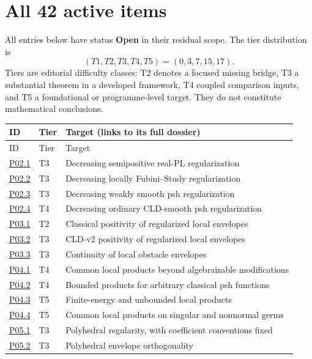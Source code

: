 \documentclass[11pt,a4paper]{article}
\theoremstyle{definition}
\theoremstyle{remark}
\begin{document}
\section*{All 42 active items}
All entries below have status \textbf{Open} in their residual scope.
The tier distribution is
\[ (T1,T2,T3,T4,T5)=(0,3,7,15,17). \]
Tiers are editorial difficulty classes: T2 denotes a focused missing
bridge, T3 a substantial theorem in a developed framework, T4 coupled
comparison inputs, and T5 a foundational or programme-level target.
They do not constitute mathematical conclusions.
\begin{longtable}{@{}p{}p{}p{}@{}}
\toprule ID & Tier & Target (links to its full dossier)\\\midrule\endfirsthead
\toprule ID & Tier & Target\\\midrule\endhead
\bottomrule\endfoot
\hyperref[atom:P02.1]{P02.1} & T3 & Decreasing semipositive real-PL regularization\\
\hyperref[atom:P02.2]{P02.2} & T3 & Decreasing locally Fubini--Study regularization\\
\hyperref[atom:P02.3]{P02.3} & T3 & Decreasing weakly smooth psh regularization\\
\hyperref[atom:P02.4]{P02.4} & T4 & Decreasing ordinary CLD-smooth psh regularization\\
\hyperref[atom:P03.1]{P03.1} & T2 & Classical positivity of regularized local envelopes\\
\hyperref[atom:P03.2]{P03.2} & T3 & CLD-v2 positivity of regularized local envelopes\\
\hyperref[atom:P03.3]{P03.3} & T3 & Continuity of local obstacle envelopes\\
\hyperref[atom:P04.1]{P04.1} & T4 & Common local products beyond algebraizable modifications\\
\hyperref[atom:P04.2]{P04.2} & T4 & Bounded products for arbitrary classical psh functions\\
\hyperref[atom:P04.3]{P04.3} & T5 & Finite-energy and unbounded local products\\
\hyperref[atom:P04.4]{P04.4} & T5 & Common local products on singular and nonnormal germs\\
\hyperref[atom:P05.1]{P05.1} & T3 & Polyhedral regularity, with coefficient conventions fixed\\
\hyperref[atom:P05.2]{P05.2} & T3 & Polyhedral envelope orthogonality\\

\end{longtable}
\end{document}
